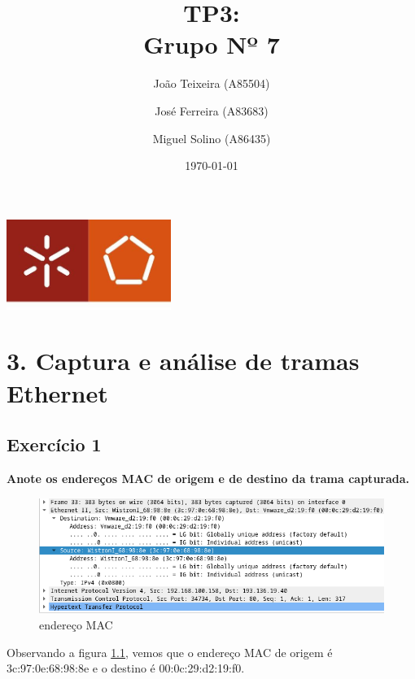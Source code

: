 \documentclass[a4paper]{report}
\begin{document}
\title{TP3:\\ 
\large Grupo Nº 7}
\author{João Teixeira (A85504) \and José Ferreira (A83683) \and Miguel Solino (A86435)}

\date{\today}

\begin{center}
    \begin{minipage}{0.75\linewidth}
        \centering
        \includegraphics[width=0.4\textwidth]{images/eng.jpeg}\par\vspace{1cm}
        \vspace{1cm}
        \href{https://www.uminho.pt/PT}
        {\color{black}{\scshape\LARGE Universidade do Minho}} \par
        \vspace{1cm}
        \href{https://www.di.uminho.pt/}
        {\color{black}{\scshape\Large Departamento de Informática}} \par
        \maketitle
    \end{minipage}
\end{center}

\tableofcontents

\chapter{3. Captura e análise de tramas Ethernet }
\section{Exercício 1}
\textbf{Anote os endereços MAC de origem e de destino da trama capturada.}

\begin{figure}[H]
    \centering 
    \includegraphics[width=\textwidth]{images/macAdress1.png}  
    \caption{endereço MAC}
    \label{fig:macAdress1}
\end{figure}
Observando a figura \ref{fig:macAdress1}, vemos que o endereço MAC de origem é 
3c:97:0e:68:98:8e e o destino é 00:0c:29:d2:19:f0.
\end{document}
